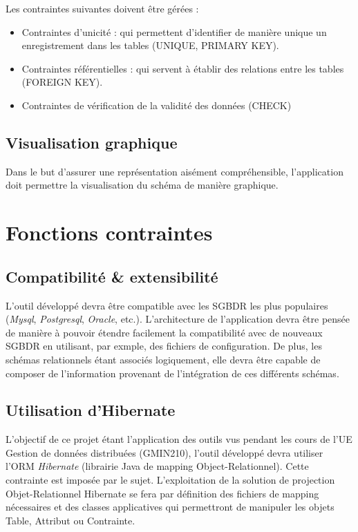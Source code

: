 				Les contraintes suivantes doivent être gérées : 
				
				\begin{itemize}
				\item Contraintes d'unicité : qui permettent d'identifier de manière unique un enregistrement dans les tables (UNIQUE, PRIMARY KEY).
				\item Contraintes référentielles : qui servent à établir des relations entre les tables (FOREIGN KEY).
				\item Contraintes de vérification de la validité des données (CHECK)
				\end{itemize}
				
		\subsection{Visualisation graphique}
		Dans le but d'assurer une représentation aisément compréhensible, l'application doit permettre la visualisation du schéma de manière graphique.

\section{Fonctions contraintes}
	\subsection{Compatibilité \& extensibilité}
	L'outil développé devra être compatible avec les SGBDR les plus populaires (\emph{Mysql}, \emph{Postgresql}, \emph{Oracle}, etc.). L'architecture de l'application devra être pensée de manière à pouvoir étendre facilement la compatibilité avec de nouveaux SGBDR en utilisant, par exmple, des fichiers de configuration. De plus, les schémas relationnels étant associés logiquement, elle devra être capable de composer de l’information provenant de l’intégration de ces différents schémas.
	\subsection{Utilisation d'Hibernate}
	L'objectif de ce projet étant l'application des outils vus pendant les cours de l'UE Gestion de données distribuées (GMIN210), l'outil développé devra utiliser l'ORM \emph{Hibernate} (librairie Java de mapping Object-Relationnel). Cette contrainte est imposée par le sujet. L'exploitation de la solution de projection Objet-Relationnel Hibernate se fera par définition des fichiers de mapping nécessaires et des classes applicatives qui permettront de manipuler les objets Table, Attribut ou Contrainte.
